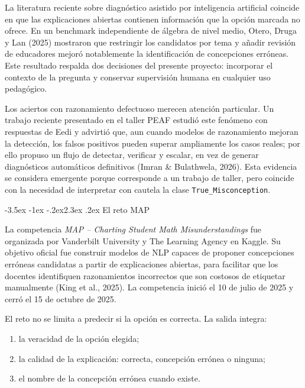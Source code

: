 \documentclass[11pt,oneside,openany]{book}
\makeatletter
\renewcommand\section{\@startsection{section}{1}{\z@}%
  {-3.5ex \@plus -1ex \@minus -.2ex}{2.3ex \@plus .2ex}%
  {\normalfont\Large\sffamily\bfseries\color{AzulMedio}}}
\newcommand{\codigo}[1]{\texttt{#1}}
\makeatother
\begin{document}
La literatura reciente sobre diagnóstico asistido por inteligencia artificial
coincide en que las explicaciones abiertas contienen información que la opción
marcada no ofrece. En un benchmark independiente de álgebra de nivel medio,
Otero, Druga y Lan (2025) mostraron que restringir los candidatos por tema y
añadir revisión de educadores mejoró notablemente la identificación de
concepciones erróneas. Este resultado respalda dos decisiones del presente
proyecto: incorporar el contexto de la pregunta y conservar supervisión humana
en cualquier uso pedagógico.

Los aciertos con razonamiento defectuoso merecen atención particular. Un
trabajo reciente presentado en el taller PEAF estudió este fenómeno con
respuestas de Eedi y advirtió que, aun cuando modelos de razonamiento mejoran la
detección, los falsos positivos pueden superar ampliamente los casos reales;
por ello propuso un flujo de detectar, verificar y escalar, en vez de generar
diagnósticos automáticos definitivos (Imran \& Bulathwela, 2026). Esta evidencia
se considera emergente porque corresponde a un trabajo de taller, pero coincide
con la necesidad de interpretar con cautela la clase
\codigo{True\_Misconception}.

\section{El reto MAP}

La competencia \emph{MAP -- Charting Student Math Misunderstandings} fue
organizada por Vanderbilt University y The Learning Agency en Kaggle. Su
objetivo oficial fue construir modelos de NLP capaces de proponer concepciones
erróneas candidatas a partir de explicaciones abiertas, para facilitar que los
docentes identifiquen razonamientos incorrectos que son costosos de etiquetar
manualmente (King et al., 2025). La competencia inició el 10 de julio de 2025 y
cerró el 15 de octubre de 2025.

El reto no se limita a predecir si la opción es correcta. La salida integra:

\begin{enumerate}
  \item la veracidad de la opción elegida;
  \item la calidad de la explicación: correcta, concepción errónea o ninguna;
  \item el nombre de la concepción errónea cuando existe.
\end{enumerate}
\end{document}
